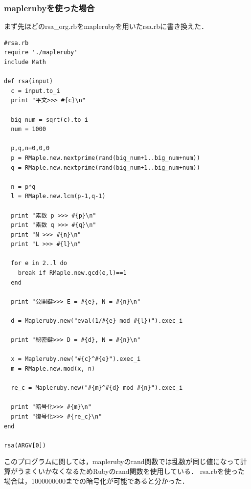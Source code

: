 \subsubsection{maplerubyを使った場合}
まず先ほどのrsa\_org.rbをmaplerubyを用いたrsa.rbに書き換えた．
\begin{lstlisting}[style=customRuby]
#rsa.rb
require './mapleruby'
include Math

def rsa(input)
  c = input.to_i
  print "平文>>> #{c}\n"
  
  big_num = sqrt(c).to_i
  num = 1000
  
  p,q,n=0,0,0
  p = RMaple.new.nextprime(rand(big_num+1..big_num+num))
  q = RMaple.new.nextprime(rand(big_num+1..big_num+num))
  
  n = p*q
  l = RMaple.new.lcm(p-1,q-1)
  
  print "素数 p >>> #{p}\n"
  print "素数 q >>> #{q}\n"
  print "N >>> #{n}\n"
  print "L >>> #{l}\n"
  
  for e in 2..l do
    break if RMaple.new.gcd(e,l)==1
  end
  
  print "公開鍵>>> E = #{e}, N = #{n}\n"
  
  d = Mapleruby.new("eval(1/#{e} mod #{l})").exec_i
  
  print "秘密鍵>>> D = #{d}, N = #{n}\n"
  
  x = Mapleruby.new("#{c}^#{e}").exec_i
  m = RMaple.new.mod(x, n)
  
  re_c = Mapleruby.new("#{m}^#{d} mod #{n}").exec_i
  
  print "暗号化>>> #{m}\n"
  print "復号化>>> #{re_c}\n"
end

rsa(ARGV[0])
\end{lstlisting}
このプログラムに関しては，maplerubyのrand関数では乱数が同じ値になって計算がうまくいかなくなるためRubyのrand関数を使用している．
rsa.rbを使った場合は，1000000000までの暗号化が可能であると分かった．
